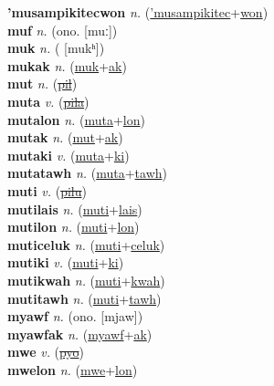 \textbf{'musampikitecwon} \textit{n.} (\hyperref['musampikitec]{'musampikitec}+\hyperref[won]{won})
 \label{'musampikitecwon} \\
\textbf{muf} \textit{n.} (ono. [muː])
 \label{muf} \\
\textbf{muk} \textit{n.} ( [mukʰ])
 \label{muk} \\
\textbf{mukak} \textit{n.} (\hyperref[muk]{muk}+\hyperref[ak]{ak})
 \label{mukak} \\
\textbf{mut} \textit{n.} (\hyperref[pil]{\sout{pil}})
 \label{mut} \\
\textbf{muta} \textit{v.} (\hyperref[pila]{\sout{pila}})
 \label{muta} \\
\textbf{mutalon} \textit{n.} (\hyperref[muta]{muta}+\hyperref[lon]{lon})
 \label{mutalon} \\
\textbf{mutak} \textit{n.} (\hyperref[mut]{mut}+\hyperref[ak]{ak})
 \label{mutak} \\
\textbf{mutaki} \textit{v.} (\hyperref[muta]{muta}+\hyperref[ki]{ki})
 \label{mutaki} \\
\textbf{mutatawh} \textit{n.} (\hyperref[muta]{muta}+\hyperref[tawh]{tawh})
 \label{mutatawh} \\
\textbf{muti} \textit{v.} (\hyperref[pilu]{\sout{pilu}})
 \label{muti} \\
\textbf{mutilais} \textit{n.} (\hyperref[muti]{muti}+\hyperref[lais]{lais})
 \label{mutilais} \\
\textbf{mutilon} \textit{n.} (\hyperref[muti]{muti}+\hyperref[lon]{lon})
 \label{mutilon} \\
\textbf{muticeluk} \textit{n.} (\hyperref[muti]{muti}+\hyperref[celuk]{celuk})
 \label{muticeluk} \\
\textbf{mutiki} \textit{v.} (\hyperref[muti]{muti}+\hyperref[ki]{ki})
 \label{mutiki} \\
\textbf{mutikwah} \textit{n.} (\hyperref[muti]{muti}+\hyperref[kwah]{kwah})
 \label{mutikwah} \\
\textbf{mutitawh} \textit{n.} (\hyperref[muti]{muti}+\hyperref[tawh]{tawh})
 \label{mutitawh} \\
\textbf{myawf} \textit{n.} (ono. [mjaw])
 \label{myawf} \\
\textbf{myawfak} \textit{n.} (\hyperref[myawf]{myawf}+\hyperref[ak]{ak})
 \label{myawfak} \\
\textbf{mwe} \textit{v.} (\hyperref[pyo]{\sout{pyo}})
 \label{mwe} \\
\textbf{mwelon} \textit{n.} (\hyperref[mwe]{mwe}+\hyperref[lon]{lon})
 \label{mwelon} \\
